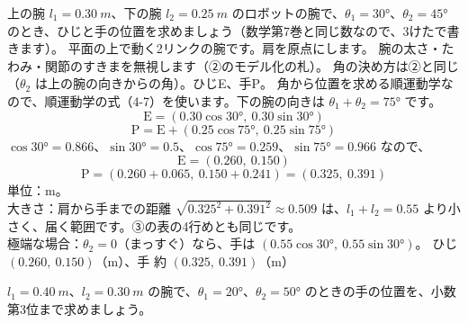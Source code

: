 \begin{phreidai}\label{ph:力-7:ex5}
上の腕 $l_1=\qty{0.30}{m}$、下の腕 $l_2=\qty{0.25}{m}$ のロボットの腕で、$\theta_1=\ang{30}$、$\theta_2=\ang{45}$ のとき、ひじと手の位置を求めましょう（数学第7巻と同じ数なので、3けたで書きます）。
\phbamen
平面の上で動く2リンクの腕です。肩を原点にします。
\phmushi
腕の太さ・たわみ・関節のすきまを無視します（②のモデル化の札）。
\phzu
角の決め方は②と同じ（$\theta_2$ は上の腕の向きからの角）。ひじE、手P。
\phriyu
角から位置を求める順運動学なので、順運動学の式（4-7）を使います。下の腕の向きは $\theta_1+\theta_2=\ang{75}$ です。
\phtateru
\[\mathrm{E}=(0.30\cos\ang{30},\ 0.30\sin\ang{30})\]
\[\mathrm{P}=\mathrm{E}+(0.25\cos\ang{75},\ 0.25\sin\ang{75})\]
\phtoku
$\cos\ang{30}=0.866$、$\sin\ang{30}=0.5$、$\cos\ang{75}=0.259$、$\sin\ang{75}=0.966$ なので、
\[\mathrm{E}=(0.260,\ 0.150)\]
\[\mathrm{P}=(0.260+0.065,\ 0.150+0.241)=(0.325,\ 0.391)\]
\phtashikame
単位：m。\\
大きさ：肩から手までの距離 $\sqrt{0.325^2+0.391^2}\approx0.509$ は、$l_1+l_2=0.55$ より小さく、届く範囲です。③の表の4行めとも同じです。\\
極端な場合：$\theta_2=0$（まっすぐ）なら、手は $(0.55\cos\ang{30},\ 0.55\sin\ang{30})$。
\kotae ひじ $(0.260,\ 0.150)$（m）、手 約 $(0.325,\ 0.391)$（m）
\end{phreidai}
\begin{jibun}
$l_1=\qty{0.40}{m}$、$l_2=\qty{0.30}{m}$ の腕で、$\theta_1=\ang{20}$、$\theta_2=\ang{50}$ のときの手の位置を、小数第3位まで求めましょう。
\end{jibun}

